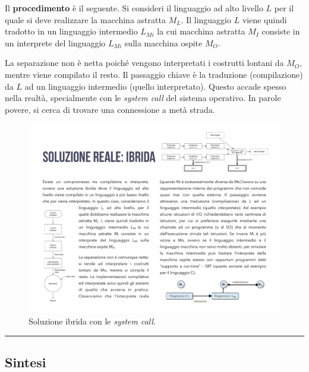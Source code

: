 \documentclass[a4paper]{article}
\newcommand{\longline}{\noindent\rule{\textwidth}{0.4pt}}
\begin{document}
	\noindent
	Il \textbf{procedimento} è il seguente.\newline
	Si consideri il linguaggio ad alto livello $L$ per il quale si deve realizzare la macchina astratta $M_{L}$.\newline
	Il linguaggio $L$ viene quindi tradotto in un linguaggio intermedio $L_{Mi}$ la cui macchina astratta $M_{I}$ consiste in un interprete del linguaggio $L_{Mi}$ sulla macchina ospite $M_{O}$.\newline

	\noindent
	La separazione non è netta poiché vengono interpretati i costrutti lontani da $M_{O}$, mentre viene compilato il resto. Il passaggio chiave è la traduzione (compilazione) da $L$ ad un linguaggio intermedio (quello interpretato). Questo accade spesso nella realtà, specialmente con le \emph{system call} del sistema operativo. In parole povere, si cerca di trovare una connessione a metà strada.\newpage
	\begin{figure}[!htp]
		\centering
		\includegraphics[width=\textwidth]{img/soluzione_ibrida_system_call.pdf}
		\caption{Soluzione ibrida con le \emph{system call}.}
	\end{figure}

	\longline

	\subsection{Sintesi}
\end{document}
